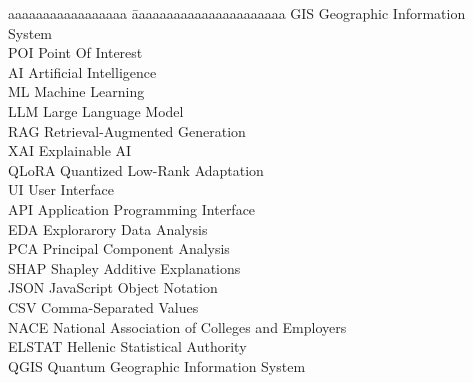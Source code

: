 
\newcommand{\abbrev}[2]{#1 \> #2\\ }
\begin{abbreviations}

\begin{tabbing}
  aaaaaaaaaaaaaaaaa \= aaaaaaaaaaaaaaaaaaaaaa\kill
  \abbrev{GIS}{Geographic Information System}
  \abbrev{POI}{Point Of Interest}
  \abbrev{AI}{Artificial Intelligence}
  \abbrev{ML}{Machine Learning}
  \abbrev{LLM}{Large Language Model}
  \abbrev{RAG}{ Retrieval-Augmented
Generation}
  \abbrev{XAI}{Explainable AI}  
  \abbrev{QLoRA}{Quantized Low-Rank Adaptation}
  \abbrev{UI}{User Interface}
  \abbrev{API}{Application Programming Interface}
  \abbrev{EDA}{Explorarory Data Analysis}
  \abbrev{PCA}{Principal Component Analysis}
  \abbrev{SHAP}{Shapley Additive Explanations}
  \abbrev{JSON}{JavaScript Object Notation}
  \abbrev{CSV}{Comma-Separated Values}
  \abbrev{NACE}{National Association of Colleges and Employers}
  \abbrev{ELSTAT}{Hellenic Statistical Authority}
  \abbrev{QGIS}{Quantum Geographic Information System}
\end{tabbing}
\end{abbreviations}